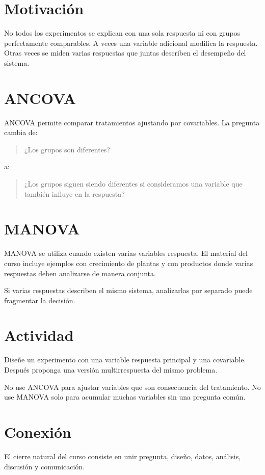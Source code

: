 
\section{Motivación}

No todos los experimentos se explican con una sola respuesta ni con grupos perfectamente comparables. A veces una variable adicional modifica la respuesta. Otras veces se miden varias respuestas que juntas describen el desempeño del sistema.

\section{ANCOVA}

ANCOVA permite comparar tratamientos ajustando por covariables. La pregunta cambia de:

\begin{quote}
¿Los grupos son diferentes?
\end{quote}

a:

\begin{quote}
¿Los grupos siguen siendo diferentes si consideramos una variable que también influye en la respuesta?
\end{quote}

\section{MANOVA}

MANOVA se utiliza cuando existen varias variables respuesta. El material del curso incluye ejemplos con crecimiento de plantas y con productos donde varias respuestas deben analizarse de manera conjunta.

\begin{idea}
Si varias respuestas describen el mismo sistema, analizarlas por separado puede fragmentar la decisión.
\end{idea}

\section{Actividad}

Diseñe un experimento con una variable respuesta principal y una covariable. Después proponga una versión multirrespuesta del mismo problema.

\begin{cuidado}
No use ANCOVA para ajustar variables que son consecuencia del tratamiento. No use MANOVA solo para acumular muchas variables sin una pregunta común.
\end{cuidado}

\section{Conexión}

El cierre natural del curso consiste en unir pregunta, diseño, datos, análisis, discusión y comunicación.
